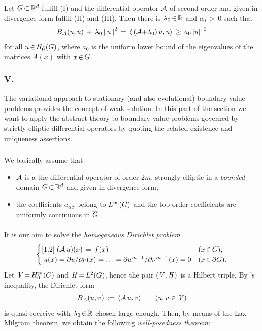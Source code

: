 \documentclass[11pt,twoside]{article}
\begin{document}
\begin{theorem}\label{GARDING_INEQUALITY_THEOREM_II}
Let $G {\,\subset\,} {\mathbb{R}}^d$ fulfill (I) and
the differential operator ${\mathcal{A}}$ of second order and given in divergence form
fulfill (II) and (III).
Then there is $\lambda_0 {\,\in\,} {\mathbb{R}}$ and $a_0 {\,>\,} 0$ such that
\[
\DF_{\A}(u,u) \+ \lambda_0 \norm{u}^2
\=
\scalar{\,(\A {+} \lambda_0)\,u}{u}
\, \geq \,
a_0 \, {\abs{u} _1}^2
\]
for all $u {\,\in\,} H_0^{1}(G)$,
where $a_0$ is the uniform lower bound of the eigenvalues
of the matrices $A(x)$ with $x {\,\in\,} G$.
\end{theorem}

\subsubsection{V. \TITLEE}
The variational approach to stationary (and also evolutional)
boundary value problems provides the concept of weak solution.
In this part of the section we want to apply the abstract theory
to boundary value problems governed by strictly elliptic differential operators
by quoting the related existence and uniqueness assertions.

\subparagraph{} %
We basically assume that

\begin{itemize}[leftmargin=15mm]
\item[(DP-1)]
${\mathcal{A}}$ is a the differential operator of order $2m$,
strongly elliptic in a \textit{bounded} domain $G {\,\subset\,} {\mathbb{R}}^d$
and given in divergence form;

\item[(DP-2)]
the coefficients $a_{\alpha \beta}$ belong to $L^{\infty}(G)$
and the top-order coefficients are uniformly continuous in $\overline{G}$.
\end{itemize}

\paragraph{} %
It is our aim to solve the \textit{homogeneous Dirichlet problem}
\[
\begin{cases}[1.2]
\; ({\mathcal{A}}\,u)(x)\,=\, f(x)& (x {\,\in\,} G),\\
\; u(x) =
\partial u/ \partial \nu (x) =
\ldots = \partial u^{m{-}1} / \partial \nu^{m{-}1}(x) = 0 & (x {\,\in\,} \partial G).\\
\end{cases}
\]
Let $\mathit{V} {\,=\,} H_0^{m}(G)$ and $\mathit{H} {\,=\,} L^2(G)$,
hence the pair $(\mathit{V},\mathit{H})$ is a Hilbert triple.
By \textsc{{\GARDING}}'s inequality,
the Dirichlet form
\[
B_{{\mathcal{A}}}(u,v) \,:=\, \langle {\mathcal{A}} \, u,v \rangle \quad \quad (u,v \in \mathit{V})
\]
is quasi-coercive with $\lambda_0 {\,\in\,} {\mathbb{R}}$ chosen large enough.
Then,
by means of the {Lax-Milgram} theorem,
we obtain the following \textit{well-posedness theorem}:
\end{document}
